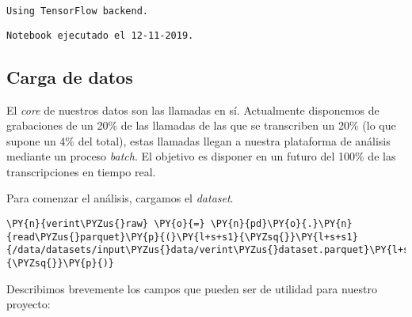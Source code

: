     \begin{Verbatim}[commandchars=\\\{\}]
Using TensorFlow backend.
    \end{Verbatim}

    \begin{Verbatim}[commandchars=\\\{\}]
Notebook ejecutado el 12-11-2019.
    \end{Verbatim}

    \hypertarget{carga-de-datos}{%
\subsection{Carga de datos}\label{carga-de-datos}}

    El \textit{core} de nuestros datos son las llamadas en sí. Actualmente disponemos de grabaciones de un 20\% de las llamadas de las que se transcriben un
20\% (lo que supone un 4\% del total), estas llamadas llegan a nuestra plataforma de análisis mediante un
proceso \textit{batch}. El objetivo es disponer en un futuro del 100\% de las
transcripciones en tiempo real.

Para comenzar el análisis, cargamos el \textit{dataset}.

\vspace{0.5cm}

    \begin{tcolorbox}[breakable, size=fbox, boxrule=1pt, pad at break*=1mm,colback=cellbackground, colframe=cellborder]
\begin{Verbatim}[commandchars=\\\{\}]
\PY{n}{verint\PYZus{}raw} \PY{o}{=} \PY{n}{pd}\PY{o}{.}\PY{n}{read\PYZus{}parquet}\PY{p}{(}\PY{l+s+s1}{\PYZsq{}}\PY{l+s+s1}{/data/datasets/input\PYZus{}data/verint\PYZus{}dataset.parquet}\PY{l+s+s1}{\PYZsq{}}\PY{p}{)}
\end{Verbatim}
\end{tcolorbox}

        
 Describimos brevemente los campos que pueden ser de utilidad para nuestro proyecto: 
 
